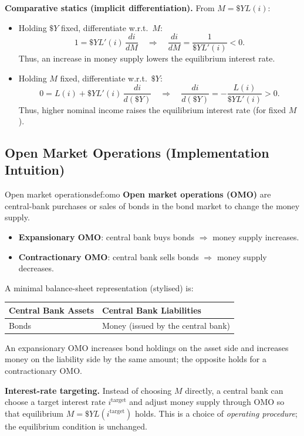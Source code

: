 \noindent
\textbf{Comparative statics (implicit differentiation).}
From $M=\$Y L(i)$:
\begin{itemize}
  \item Holding $\$Y$ fixed, differentiate w.r.t.\ $M$:
  \[
  1 = \$Y L'(i)\,\frac{di}{dM}
  \quad\Longrightarrow\quad
  \frac{di}{dM} = \frac{1}{\$Y L'(i)} < 0.
  \]
  Thus, an increase in money supply lowers the equilibrium interest rate.
  \item Holding $M$ fixed, differentiate w.r.t.\ $\$Y$:
  \[
  0 = L(i) + \$Y L'(i)\,\frac{di}{d(\$Y)}
  \quad\Longrightarrow\quad
  \frac{di}{d(\$Y)} = -\frac{L(i)}{\$Y L'(i)} > 0.
  \]
  Thus, higher nominal income raises the equilibrium interest rate (for fixed $M$).
\end{itemize}

\subsection{Open Market Operations (Implementation Intuition)}

\begin{definition}{Open market operations}{def:omo}
\textbf{Open market operations (OMO)} are central-bank purchases or sales of bonds in the bond market to change the money supply.
\begin{itemize}
  \item \textbf{Expansionary OMO}: central bank buys bonds $\Rightarrow$ money supply increases.
  \item \textbf{Contractionary OMO}: central bank sells bonds $\Rightarrow$ money supply decreases.
\end{itemize}
\end{definition}

\noindent
A minimal balance-sheet representation (stylised) is:
\begin{center}
\begin{tabular}{|p{6.2cm}|p{6.2cm}|}
\hline
\textbf{Central Bank Assets} & \textbf{Central Bank Liabilities} \\
\hline
Bonds & Money (issued by the central bank) \\
\hline
\end{tabular}
\end{center}

\noindent
An expansionary OMO increases bond holdings on the asset side and increases money on the liability side by the same amount; the opposite holds for a contractionary OMO.

\begin{policynote}
\textbf{Interest-rate targeting.}
Instead of choosing $M$ directly, a central bank can choose a target interest rate $i^{\text{target}}$ and adjust money supply through OMO so that equilibrium $M=\$Y L(i^{\text{target}})$ holds. This is a choice of \emph{operating procedure}; the equilibrium condition is unchanged.
\end{policynote}

